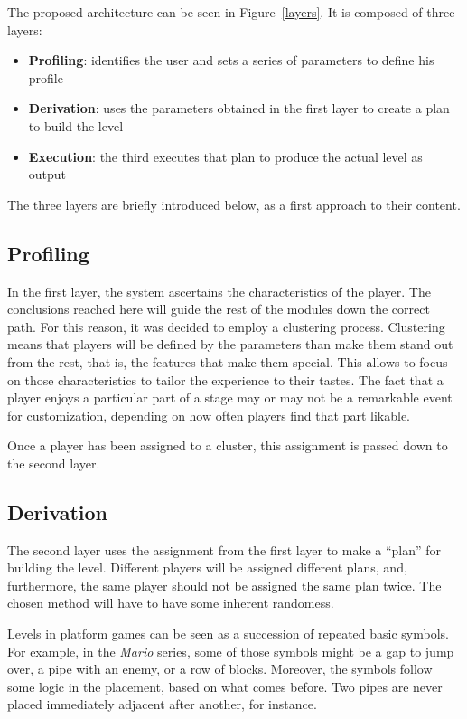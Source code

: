 \documentclass[conference]{IEEEtran}
\begin{document}
The proposed architecture can be seen in Figure~\ref{layers}. It is composed of three layers:

\begin{itemize}
	
\item \textbf{Profiling}: identifies the user and sets a series of parameters to define his profile

\item \textbf{Derivation}: uses the parameters obtained in the first layer to create a plan to build the level

\item \textbf{Execution}: the third executes that plan to produce the actual level as output

\end{itemize}

The three layers are briefly introduced below, as a first approach to their content.

\subsection{Profiling}

In the first layer, the system ascertains the characteristics of the player. The conclusions reached here will guide the rest of the modules down the correct path. For this reason, it was decided to employ a clustering process. Clustering means that players will be defined by the parameters than make them stand out from the rest, that is, the features that make them special. This allows to focus on those characteristics to tailor the experience to their tastes. The fact that a player enjoys a particular part of a stage may or may not be a remarkable event for customization, depending on how often players find that part likable.

Once a player has been assigned to a cluster, this assignment is passed down to the second layer.

\subsection{Derivation}

The second layer uses the assignment from the first layer to make a ``plan'' for building the level. Different players will be assigned different plans, and, furthermore, the same player should not be assigned the same plan twice. The chosen method will have to have some inherent randomess.

Levels in platform games can be seen as a succession of repeated basic symbols. For example, in the \textit{Mario} series, some of those symbols might be a gap to jump over, a pipe with an enemy, or a row of blocks. Moreover, the symbols follow some logic in the placement, based on what comes before. Two pipes are never placed immediately adjacent after another, for instance.
\end{document}
